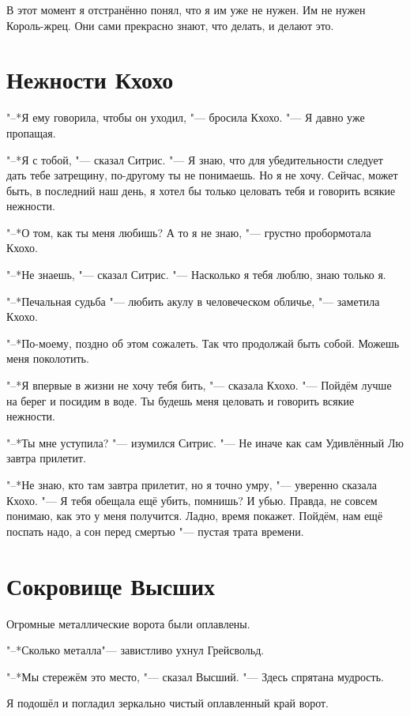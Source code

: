 \documentclass[a4paper,10pt]{book}
\newcommand{\ldotst}{\so{...}\xspace}
\begin{document}
В этот момент я отстранённо понял, что я им уже не нужен. Им не нужен 
Король-жрец. Они сами прекрасно знают, что делать, и делают это.

\section{Нежности Кхохо}

"--*Я ему говорила, чтобы он уходил, "--- бросила Кхохо. "--- Я давно уже 
пропащая.

"--*Я с тобой, "--- сказал Ситрис. "--- Я знаю, что для убедительности следует 
дать тебе затрещину, по-другому ты не понимаешь. Но я не хочу. Сейчас, может 
быть, в последний наш день, я хотел бы только целовать тебя и говорить всякие 
нежности.

"--*О том, как ты меня любишь? А то я не знаю, "--- грустно пробормотала Кхохо.

"--*Не знаешь, "--- сказал Ситрис. "--- Насколько я тебя люблю, знаю только я.

"--*Печальная судьба "--- любить акулу в человеческом обличье, "--- заметила 
Кхохо.

"--*По-моему, поздно об этом сожалеть. Так что продолжай быть собой. Можешь 
меня поколотить.

"--*Я впервые в жизни не хочу тебя бить, "--- сказала Кхохо. "--- Пойдём лучше 
на берег и посидим в воде. Ты будешь меня целовать и говорить всякие нежности.

"--*Ты мне уступила? "--- изумился Ситрис. "--- Не иначе как сам Удивлённый Лю 
завтра прилетит.

"--*Не знаю, кто там завтра прилетит, но я точно умру, "--- уверенно сказала 
Кхохо. "--- Я тебя обещала ещё убить, помнишь? И убью. Правда, не совсем 
понимаю, как это у меня получится. Ладно, время покажет. Пойдём, нам ещё 
поспать надо, а сон перед смертью "--- пустая трата времени.

\section{Сокровище Высших}

Огромные металлические ворота были оплавлены.

"--*Сколько металла\ldotst "--- завистливо ухнул Грейсвольд.

"--*Мы стережём это место, "--- сказал Высший. "--- Здесь спрятана мудрость.

Я подошёл и погладил зеркально чистый оплавленный край ворот.
\end{document}
